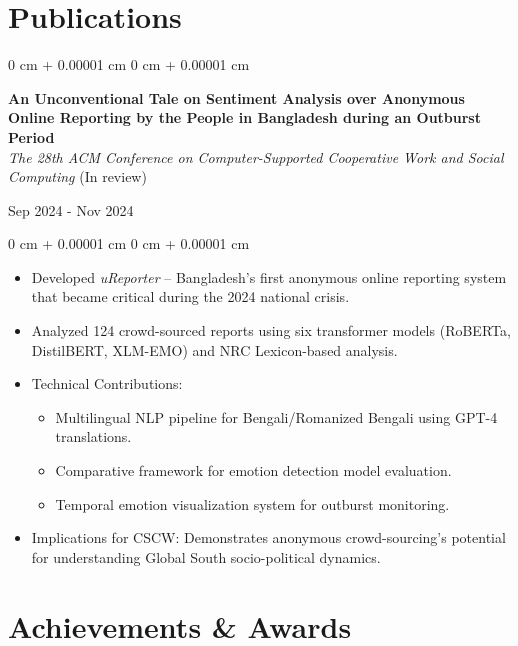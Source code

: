 \documentclass[10pt, letterpaper]{article}
\newenvironment{highlights}{
    \begin{itemize}[
        topsep=0.10 cm,
        parsep=0.10 cm,
        partopsep=0pt,
        itemsep=0pt,
        leftmargin=0 cm + 10pt
    ]
}{
    \end{itemize}
} %
\newenvironment{onecolentry}{
    \begin{adjustwidth}{
        0 cm + 0.00001 cm
    }{
        0 cm + 0.00001 cm
    }
}{
    \end{adjustwidth}
} %
\newenvironment{twocolentry}[2][]{
    \onecolentry
    \def\secondColumn{#2}
    \setcolumnwidth{\fill, 4.5 cm}
    \begin{paracol}{2}
}{
    \switchcolumn \raggedleft \secondColumn
    \end{paracol}
    \endonecolentry
} %
\begin{document}
\section{Publications}

\begin{twocolentry}{Sep 2024 - Nov 2024}
    \textbf{An Unconventional Tale on Sentiment Analysis over Anonymous Online Reporting by the People in Bangladesh during an Outburst Period} \\
    \textit{The 28th ACM Conference on Computer-Supported Cooperative Work and Social Computing} (In review)
\end{twocolentry}

\begin{onecolentry}
    \begin{highlights}
        \item Developed \textit{uReporter} -- Bangladesh's first anonymous online reporting system that became critical during the 2024 national crisis.
        \item Analyzed 124 crowd-sourced reports using six transformer models (RoBERTa, DistilBERT, XLM-EMO) and NRC Lexicon-based analysis.
        
        \item Technical Contributions:
            \begin{itemize}
                \item Multilingual NLP pipeline for Bengali/Romanized Bengali using GPT-4 translations.
                \item Comparative framework for emotion detection model evaluation.
                \item Temporal emotion visualization system for outburst monitoring.
            \end{itemize}
        \item Implications for CSCW: Demonstrates anonymous crowd-sourcing's potential for understanding Global South socio-political dynamics.
    \end{highlights}
\end{onecolentry}

    \section{Achievements \& Awards}
\end{document}
